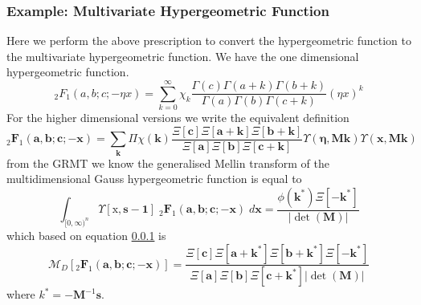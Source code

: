 \documentclass[journal=jcisd8,manuscript=article,layout=onecolumn,pdftex,floatfix,amsmath,amssymb,10pt]{achemso}
\begin{document}
\subsubsection{Example: Multivariate Hypergeometric Function}
Here we perform the above prescription to convert the hypergeometric function to the multivariate hypergeometric function. We have the one dimensional hypergeometric function.
\begin{equation}
_2F_1(a,b;c;-\eta x) = \sum_{k=0}^\infty \chi_k \frac{\Gamma(c)\Gamma(a+k)\Gamma(b+k)}{\Gamma(a)\Gamma(b)\Gamma(c+k)} (\eta x)^k
\end{equation}
For the higher dimensional versions we write the equivalent definition
\begin{equation}
_2\mathbf{F}_1(\mathbf{a},\mathbf{b};\mathbf{c};-\mathbf{x}) = \sum_{\mathbf{k}}\Pi\chi(\mathbf{k})\frac{\Xi[\mathbf{c}]\Xi[\mathbf{a}+\mathbf{k}]\Xi[\mathbf{b}+\mathbf{k}]}{\Xi[\mathbf{a}]\Xi[\mathbf{b}]\Xi[\mathbf{c}+\mathbf{k}]}\Upsilon(\boldsymbol\eta,\mathbf{M}\mathbf{k})\Upsilon(\mathbf{x},\mathbf{M}\mathbf{k})
\end{equation}
from the GRMT we know the generalised Mellin transform of the multidimensional Gauss hypergeometric function is equal to
\begin{equation}
\int_{[0,\infty)^n}\Upsilon[\mathrm{x},\mathbf{s-1}]\;_2\mathbf{F}_1(\mathbf{a},\mathbf{b};\mathbf{c};-\mathbf{x})\; d\mathbf{x} = \frac{\phi(\mathbf{k}^*)\Xi[-\mathbf{k}^*]}{|\det(\mathbf{M})|}
\end{equation}
which based on equation \ref{} is \begin{equation}
\mathcal{M}_D[_2\mathbf{F}_1(\mathbf{a},\mathbf{b};\mathbf{c};-\mathbf{x})] = \frac{\Xi[\mathbf{c}]\Xi[\mathbf{a}+\mathbf{k}^*]\Xi[\mathbf{b}+\mathbf{k}^*]\Xi[-\mathbf{k}^*]}{\Xi[\mathbf{a}]\Xi[\mathbf{b}]\Xi[\mathbf{c}+\mathbf{k}^*]|\det(\mathbf{M})|}
\end{equation}
where $k^* = -\mathbf{M}^{-1}\mathbf{s}$.

\end{document}
